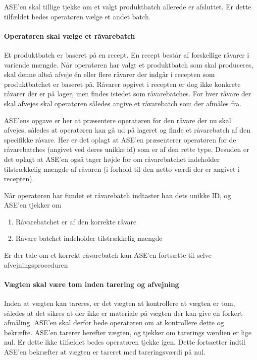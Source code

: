 \documentclass[a4paper]{article}
\begin{document}
ASE'en skal tillige tjekke om et valgt produktbatch allerede er afsluttet. Er dette tilfældet bedes operatøren vælge et andet batch.


\paragraph{Operatøren skal vælge et råvarebatch} %

Et produktbatch er baseret på en recept. En recept består af forskellige råvarer i variende mængde. Når operatøren har valgt et produktbatch som skal produceres, skal denne altså afveje én eller flere råvarer der indgår i recepten som produktbatchet er baseret på. Råvarer opgivet i recepten er dog ikke konkrete råvarer der er på lager, men findes istedet som råvarebatches. For hver råvare der skal afvejes skal operatøren således angive et råvarebatch som der afmåles fra.

ASE'ens opgave er her at præsentere operatøren for den råvare der nu skal afvejes, således at operatøren kan gå ud på lageret og finde et råvarebatch af den specifikke råvare. Her er det oplagt at ASE'en præsenterer operatøren for de råvarebatches (angivet ved deres unikke id) som er af den rette type. Desuden er det oplagt at ASE'en også tager højde for om råvarebatchet indeholder tilstrækkelig mængde af råvaren (i forhold til den netto værdi der er angivet i recepten).

Når operatøren har fundet et råvarebatch indtaster han dets unikke ID, og ASE'en tjekker om
\begin{enumerate}
  \item Råvarebatchet er af den korrekte råvare
  \item Råvare batchet indeholder tilstrækkelig mængde
\end{enumerate}

Er der tale om et korrekt råvarebatch kan ASE'en fortsætte til selve afvejningsproceduren


\paragraph{Vægten skal være tom inden tarering og afvejning} %

Inden at vægten kan tareres, er det vægten at kontrollere at vægten er tom, således at det sikres at der ikke er materiale på vægten der kan give en forkert afmåling. ASE'en skal derfor bede operatøren om at kontrollere dette og bekræfte. ASE'en tarerer herefter vægten, og tjekker om tarerings værdien er lige nul. Er dette ikke tilfældet bedes operatøren tjekke igen. Dette fortsætter indtil ASE'en bekræfter at vægten er tareret med tareringsværdi på nul.
\end{document}
